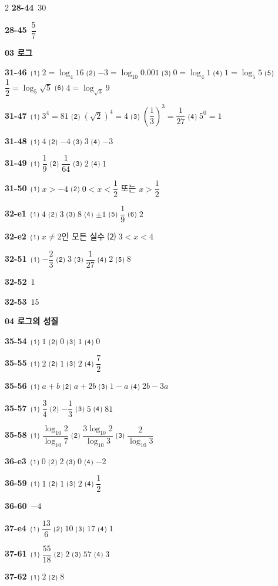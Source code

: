 \documentclass[10pt,a4paper]{article}
\begin{document}
\begin{multicols}{2}
\noindent\textbf{28-44}\ $30$\par
\noindent\textbf{28-45}\ $\dfrac{5}{7}$\par
\noindent\textbf{03 로그}\par\smallskip
\noindent\textbf{31-46}\ ⑴ $2=\log_4 16$ ⑵ $-3=\log_{10} 0.001$ ⑶ $0=\log_4 1$ ⑷ $1=\log_5 5$ ⑸ $\dfrac{1}{2}=\log_5 \sqrt{5}$ ⑹ $4=\log_{\sqrt{3}} 9$\par
\noindent\textbf{31-47}\ ⑴ $3^4=81$ ⑵ $(\sqrt{2})^4=4$ ⑶ $\left(\dfrac{1}{3}\right)^3=\dfrac{1}{27}$ ⑷ $5^0=1$\par
\noindent\textbf{31-48}\ ⑴ $4$ ⑵ $-4$ ⑶ $3$ ⑷ $-3$\par
\noindent\textbf{31-49}\ ⑴ $\dfrac{1}{9}$ ⑵ $\dfrac{1}{64}$ ⑶ $2$ ⑷ $1$\par
\noindent\textbf{31-50}\ ⑴ $x>-4$ ⑵ $0<x<\dfrac{1}{2}$ 또는 $x>\dfrac{1}{2}$\par
\noindent\textbf{32-e1}\ ⑴ $4$ ⑵ $3$ ⑶ $8$ ⑷ $\pm 1$ ⑸ $\dfrac{1}{9}$ ⑹ $2$\par
\noindent\textbf{32-e2}\ ⑴ $x\ne 2$인 모든 실수 ⑵ $3<x<4$\par
\noindent\textbf{32-51}\ ⑴ $-\dfrac{2}{3}$ ⑵ $3$ ⑶ $\dfrac{1}{27}$ ⑷ $2$ ⑸ $8$\par
\noindent\textbf{32-52}\ $1$\par
\noindent\textbf{32-53}\ $15$\par
\noindent\textbf{04 로그의 성질}\par\smallskip
\noindent\textbf{35-54}\ ⑴ $1$ ⑵ $0$ ⑶ $1$ ⑷ $0$\par
\noindent\textbf{35-55}\ ⑴ $2$ ⑵ $1$ ⑶ $2$ ⑷ $\dfrac{7}{2}$\par
\noindent\textbf{35-56}\ ⑴ $a+b$ ⑵ $a+2b$ ⑶ $1-a$ ⑷ $2b-3a$\par
\noindent\textbf{35-57}\ ⑴ $\dfrac{3}{4}$ ⑵ $-\dfrac{1}{3}$ ⑶ $5$ ⑷ $81$\par
\noindent\textbf{35-58}\ ⑴ $\dfrac{\log_{10} 2}{\log_{10} 7}$ ⑵ $\dfrac{3\log_{10} 2}{\log_{10} 3}$ ⑶ $\dfrac{2}{\log_{10} 3}$\par
\noindent\textbf{36-e3}\ ⑴ $0$ ⑵ $2$ ⑶ $0$ ⑷ $-2$\par
\noindent\textbf{36-59}\ ⑴ $1$ ⑵ $1$ ⑶ $2$ ⑷ $\dfrac{1}{2}$\par
\noindent\textbf{36-60}\ $-4$\par
\noindent\textbf{37-e4}\ ⑴ $\dfrac{13}{6}$ ⑵ $10$ ⑶ $17$ ⑷ $1$\par
\noindent\textbf{37-61}\ ⑴ $\dfrac{55}{18}$ ⑵ $2$ ⑶ $57$ ⑷ $3$\par
\noindent\textbf{37-62}\ ⑴ $2$ ⑵ $8$\par

\end{multicols}
\end{document}
